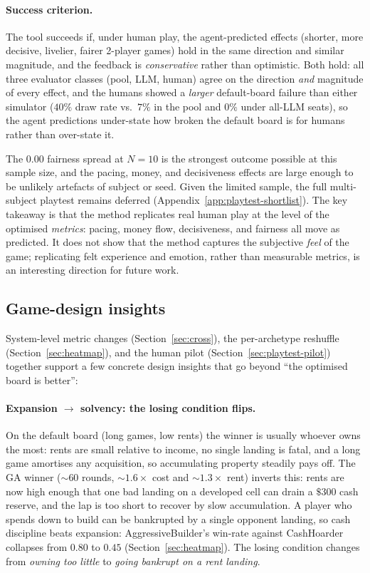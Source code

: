 \documentclass[10pt]{article}
\begin{document}
\paragraph{Success criterion.} The tool succeeds if, under human play,
the agent-predicted effects (shorter, more decisive, livelier, fairer
2-player games) hold in the same direction and similar magnitude, and
the feedback is \emph{conservative} rather than optimistic. Both hold:
all three evaluator classes (pool, LLM, human) agree on the direction
\emph{and} magnitude of every effect, and the humans showed a
\emph{larger} default-board failure than either simulator ($40\%$ draw
rate vs.\ $7\%$ in the pool and $0\%$ under all-LLM seats), so the
agent predictions under-state how broken the default board is for
humans rather than over-state it.

The $0.00$ fairness spread at $N{=}10$ is the strongest outcome
possible at this sample size, and the pacing, money, and decisiveness
effects are large enough to be unlikely artefacts of subject or seed.
Given the limited sample, the full multi-subject playtest remains
deferred (Appendix~\ref{app:playtest-shortlist}). The key takeaway is
that the method replicates real human play at the level of the
optimised \emph{metrics}: pacing, money flow, decisiveness, and
fairness all move as predicted. It does not show that the method
captures the subjective \emph{feel} of the game; replicating felt
experience and emotion, rather than measurable metrics, is an
interesting direction for future work.

\subsection{Game-design insights}\label{sec:insights}

System-level metric changes (Section~\ref{sec:cross}), the
per-archetype reshuffle (Section~\ref{sec:heatmap}), and the human
pilot (Section~\ref{sec:playtest-pilot}) together support a few
concrete design insights that go beyond ``the optimised board is
better'':

\paragraph{Expansion $\to$ solvency: the losing condition flips.}
On the default board (long games, low rents) the winner is usually
whoever owns the most: rents are small relative to income, no single
landing is fatal, and a long game amortises any acquisition, so
accumulating property steadily pays off. The GA winner ($\sim$$60$
rounds, $\sim$$1.6\times$ cost and $\sim$$1.3\times$ rent) inverts
this: rents are now high enough that one bad landing on a developed
cell can drain a $\$300$ cash reserve, and the lap is too short to
recover by slow accumulation. A player who spends down to build can be
bankrupted by a single opponent landing, so cash discipline beats
expansion: AggressiveBuilder's win-rate against CashHoarder collapses
from $0.80$ to $0.45$ (Section~\ref{sec:heatmap}). The losing condition
changes from \emph{owning too little} to \emph{going bankrupt on a rent
landing}.
\end{document}
